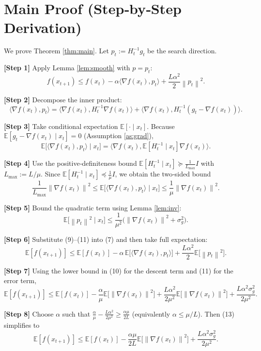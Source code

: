 \documentclass{article}
\newcommand{\E}{\mathbb{E}}
\newcommand{\norm}[1]{\left\|#1\right\|}
\newcommand{\iprod}[2]{\langle #1,#2\rangle}
\begin{document}
\newpage
\section*{Main Proof (Step‑by‑Step Derivation)}
We prove Theorem \ref{thm:main}. Let $p_t:=H_t^{-1}g_t$ be the search direction.

\noindent\textbf{[Step 1]} Apply Lemma \ref{lem:smooth} with $p=p_t$:
\[
f(x_{t+1})\le f(x_t)-\alpha\iprod{\nabla f(x_t)}{p_t}
+\frac{L\alpha^{2}}{2}\norm{p_t}^{2}. \tag{7}
\]

\noindent\textbf{[Step 2]} Decompose the inner product:
\[
\iprod{\nabla f(x_t)}{p_t}
=\iprod{\nabla f(x_t)}{H_t^{-1}\nabla f(x_t)}
+\iprod{\nabla f(x_t)}{H_t^{-1}(g_t-\nabla f(x_t))}. \tag{8}
\]

\noindent\textbf{[Step 3]} Take conditional expectation $\E[\cdot\mid x_t]$.
Because $\E[g_t-\nabla f(x_t)\mid x_t]=0$ (Assumption \ref{as:grad}),
\[
\E\!\bigl[\iprod{\nabla f(x_t)}{p_t}\mid x_t\bigr]
= \iprod{\nabla f(x_t)}{\E[H_t^{-1}\mid x_t]\nabla f(x_t)}. \tag{9}
\]

\noindent\textbf{[Step 4]} Use the positive‑definiteness bound
$\E[H_t^{-1}\mid x_t]\succeq \frac{1}{L_{\max}}I$ with $L_{\max}:=L/\mu$.
Since $\E[H_t^{-1}\mid x_t]\preceq\frac{1}{\mu}I$, we obtain the two‑sided bound
\[
\frac{1}{L_{\max}}\norm{\nabla f(x_t)}^{2}
\le \E\!\bigl[\iprod{\nabla f(x_t)}{p_t}\mid x_t\bigr]
\le \frac{1}{\mu}\norm{\nabla f(x_t)}^{2}. \tag{10}
\]

\noindent\textbf{[Step 5]} Bound the quadratic term using Lemma \ref{lem:inv}:
\[
\E\!\bigl[\norm{p_t}^{2}\mid x_t\bigr]
\le \frac{1}{\mu^{2}}\bigl(\norm{\nabla f(x_t)}^{2}+\sigma_g^{2}\bigr). \tag{11}
\]

\noindent\textbf{[Step 6]} Substitute (9)–(11) into (7) and then take full expectation:
\[
\E[f(x_{t+1})]\le \E[f(x_t)]
-\alpha\,\E\!\bigl[\iprod{\nabla f(x_t)}{p_t}\bigr]
+\frac{L\alpha^{2}}{2}\E\!\bigl[\norm{p_t}^{2}\bigr]. \tag{12}
\]

\noindent\textbf{[Step 7]} Using the lower bound in (10) for the descent term and (11) for the error term,
\[
\E[f(x_{t+1})]\le \E[f(x_t)]
-\frac{\alpha}{\mu}\E\!\bigl[\norm{\nabla f(x_t)}^{2}\bigr]
+\frac{L\alpha^{2}}{2\mu^{2}}\E\!\bigl[\norm{\nabla f(x_t)}^{2}\bigr]
+\frac{L\alpha^{2}\sigma_g^{2}}{2\mu^{2}}. \tag{13}
\]

\noindent\textbf{[Step 8]} Choose $\alpha$ such that $\displaystyle\frac{\alpha}{\mu}-
\frac{L\alpha^{2}}{2\mu^{2}}\ge\frac{\alpha\mu}{2L}$
(equivalently $\alpha\le\mu/L$). Then (13) simplifies to
\[
\E[f(x_{t+1})]\le \E[f(x_t)]
-\frac{\alpha\mu}{2L}\E\!\bigl[\norm{\nabla f(x_t)}^{2}\bigr]
+\frac{L\alpha^{2}\sigma_g^{2}}{2\mu^{2}}. \tag{14}
\]
\end{document}
